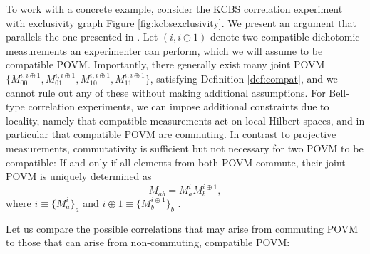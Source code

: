 To work with a concrete example, consider the KCBS correlation experiment with exclusivity graph Figure \ref{fig:kcbsexclusivity}. We present an argument that parallels the one presented in \cite{Kunjwal2019}.
Let $(i,i\oplus1)$ denote two compatible dichotomic measurements an experimenter can perform, which we will assume to be compatible POVM. Importantly, there generally exist many joint POVM $\{M_{00}^{i,i\oplus1},M_{01}^{i,i\oplus1}, M_{10}^{i,i\oplus1},M_{11}^{i,i\oplus1}\}$, satisfying Definition \ref{def:compat}, and we cannot rule out any of these without making additional assumptions. For Bell-type correlation experiments, we can impose additional constraints due to locality, namely that compatible measurements act on local Hilbert spaces, and in particular that compatible POVM are commuting. In contrast to projective measurements, commutativity is sufficient but not necessary for two POVM to be compatible: If and only if all elements from both POVM commute, their joint POVM is uniquely determined as
\begin{equation*}
    M_{ab}=M_{a}^i M_{b}^{i\oplus1},
\end{equation*}
where $i\equiv\{M_{a}^i\}_a$ and $i\oplus1\equiv\{M_{b}^{i\oplus1}\}_b$ \cite{Kunjwal2019}.

Let us compare the possible correlations that may arise from commuting POVM to those that can arise from non-commuting, compatible POVM:

